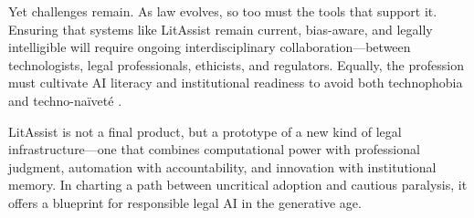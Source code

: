 \documentclass[12pt,a4paper]{article}
\begin{document}
Yet challenges remain. As law evolves, so too must the tools that support it. Ensuring that systems like LitAssist remain current, bias-aware, and legally intelligible will require ongoing interdisciplinary collaboration—between technologists, legal professionals, ethicists, and regulators. Equally, the profession must cultivate AI literacy and institutional readiness to avoid both technophobia and techno-naïveté \cite{Wischmeyer2020}.

LitAssist is not a final product, but a prototype of a new kind of legal infrastructure—one that combines computational power with professional judgment, automation with accountability, and innovation with institutional memory. In charting a path between uncritical adoption and cautious paralysis, it offers a blueprint for responsible legal AI in the generative age.
\end{document}
